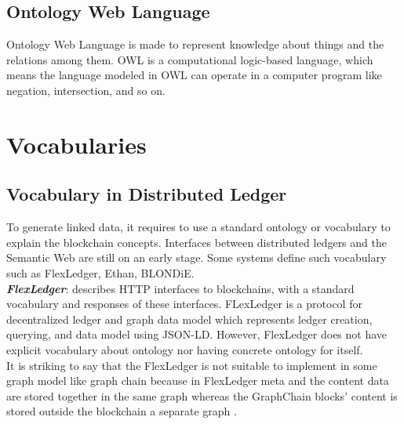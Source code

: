 \subsection{Ontology Web Language }
Ontology Web Language is made to represent knowledge about things and the relations among them. OWL is a computational logic-based language, which means the language modeled in OWL can operate in a computer program like negation, intersection, and so on.

\section{Vocabularies}
\subsection{Vocabulary in Distributed Ledger}
To generate linked data, it requires to use a standard ontology or vocabulary to explain the blockchain concepts. Interfaces between distributed ledgers and the Semantic Web are still on an early stage. Some systems define such vocabulary such as FlexLedger, Ethan, BLONDiE\cite{Third}.\\

\textbf{\textit{FlexLedger}}: describes HTTP interfaces to blockchains, with a standard vocabulary and responses of these interfaces. FLexLedger is a protocol for decentralized ledger and graph data model which represents ledger creation, querying, and data model using JSON-LD. However, FlexLedger does not have explicit vocabulary about ontology nor having concrete ontology for itself. 
\\It is striking to say that the FlexLedger is not suitable to implement in some graph model like graph chain because in FlexLedger meta and the content data are stored together in the same graph whereas the GraphChain blocks’ content is stored outside the blockchain a separate graph \cite{Sopek}.\\

